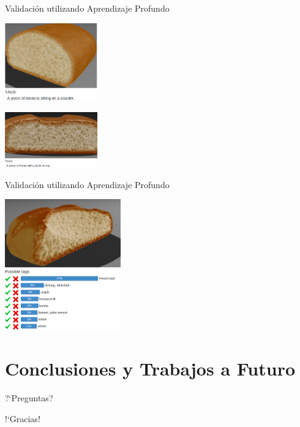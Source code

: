 \documentclass[spanish]{beamer}
\begin{document}
\begin{frame}{Validación utilizando Aprendizaje Profundo}

\centerline{\includegraphics[width=4cm]{../figures/deep2}}
\centerline{\includegraphics[width=4cm]{../figures/deep3}}
\end{frame}
\begin{frame}{Validación utilizando Aprendizaje Profundo}
\centerline{\includegraphics[width=5cm]{../figures/deep4}}

\end{frame}


\section{Conclusiones y Trabajos a Futuro}

\begin{frame}
\centering

?`Preguntas?

\end{frame}

\begin{frame}
\centering

!`Gracias!

\end{frame}
\end{document}

